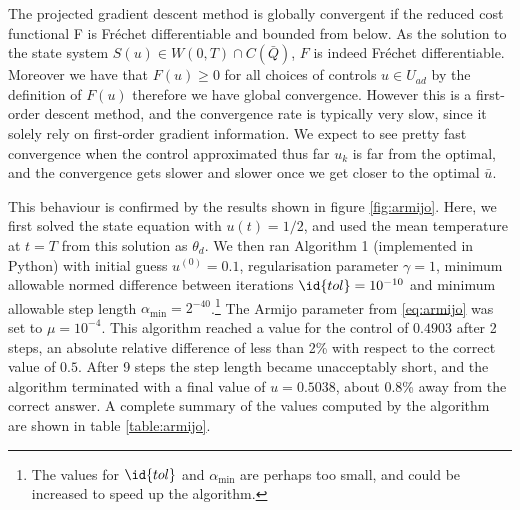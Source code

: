 The projected gradient descent method is globally convergent if the reduced cost functional F is Fréchet differentiable and bounded from below. As the solution to the state system $S(u) \in W(0,T) \cap C(\bar{Q})$, $F$ is indeed Fréchet differentiable. Moreover we have that $F(u) \geq 0$ for all choices of controls $u \in U_{ad}$ by the definition of $F(u)$ therefore we have global convergence. However this is a first-order descent method, and the convergence rate is typically very slow, since it solely rely on first-order gradient information. We expect to see pretty fast convergence when the control approximated thus far $u_k$ is far from the optimal, and the convergence gets slower and slower once we get closer to the optimal $\bar{u}$.

This behaviour is confirmed by the results shown in figure \ref{fig:armijo}. Here, we first solved the state equation with $u(t) = 1/2$, and used the mean temperature at $t=T$ from this solution as $\theta_d$. We then ran Algorithm 1 (implemented in Python) with initial guess $u^{(0)} = 0.1$, regularisation parameter $\gamma = 1$, minimum allowable normed difference between iterations $\id{tol} = 10^{-10}$ and minimum allowable step length $\alpha_{\min} = 2^{-40}$.\footnote{The values for $\id{tol}$ and $\alpha_{\min}$ are perhaps too small, and could be increased to speed up the algorithm.} The Armijo parameter from \eqref{eq:armijo} was set to $\mu=10^{-4}$. This algorithm reached a value for the control of $0.4903$ after 2 steps, an absolute relative difference of less than 2\% with respect to the correct value of $0.5$. After 9 steps the step length became unacceptably short, and the algorithm terminated with a final value of $u=0.5038$, about 0.8\% away from the correct answer. A complete summary of the values computed by the algorithm are shown in table \ref{table:armijo}. 

